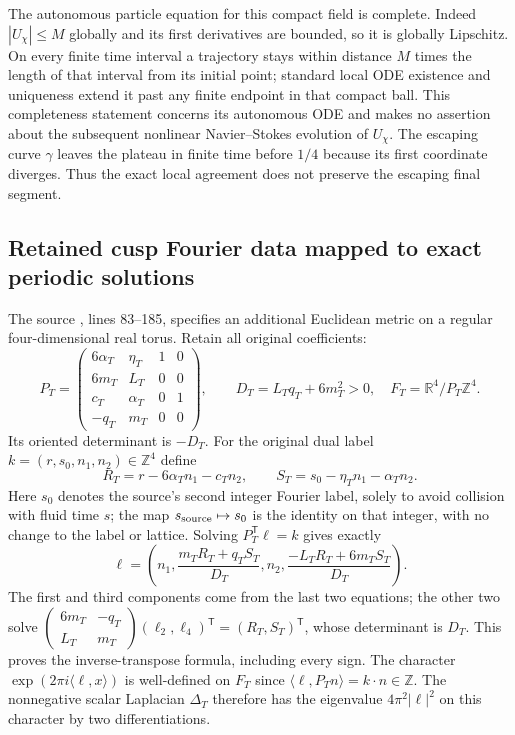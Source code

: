 The autonomous particle equation for this compact field is complete.
Indeed $|U_\chi|\le M$ globally and its first derivatives are bounded,
so it is globally Lipschitz.  On every finite time interval a trajectory
stays within distance $M$ times the length of that interval from its
initial point; standard local ODE existence and uniqueness extend it
past any finite endpoint in that compact ball.  This completeness
statement concerns its autonomous ODE and makes no assertion about
the subsequent nonlinear Navier--Stokes evolution of $U_\chi$.
The escaping curve $\gamma$ leaves the plateau in finite time before
$1/4$ because its first coordinate diverges.  Thus the exact local
agreement does not preserve the escaping final segment.

\subsection{Retained cusp Fourier data mapped to exact periodic solutions}
The source
,
lines 83--185, specifies an additional Euclidean metric on a regular
four-dimensional real torus.  Retain all original coefficients:
\[
 P_T=\begin{pmatrix}
 6\alpha_T&\eta_T&1&0\\6m_T&L_T&0&0\\
 c_T&\alpha_T&0&1\\-q_T&m_T&0&0
 \end{pmatrix},\qquad D_T=L_Tq_T+6m_T^2>0,
 \quad F_T=\mathbb R^4/P_T\mathbb Z^4.
\]
Its oriented determinant is $-D_T$.  For the original dual label
$k=(r,s_0,n_1,n_2)\in\mathbb Z^4$ define
\[
 R_T=r-6\alpha_Tn_1-c_Tn_2,\qquad
 S_T=s_0-\eta_Tn_1-\alpha_Tn_2.
\]
Here $s_0$ denotes the source's second integer Fourier label, solely to
avoid collision with fluid time $s$; the map $s_{\rm source}\mapsto s_0$
is the identity on that integer, with no change to the label or lattice.
Solving $P_T^{\mathsf T}\ell=k$ gives exactly
\[
 \ell=\left(n_1,\frac{m_TR_T+q_TS_T}{D_T},n_2,
                  \frac{-L_TR_T+6m_TS_T}{D_T}\right).
\]
The first and third components come from the last two equations; the other
two solve
$\begin{pmatrix}6m_T&-q_T\\L_T&m_T\end{pmatrix}
(\ell_2,\ell_4)^{\mathsf T}=(R_T,S_T)^{\mathsf T}$,
whose determinant is $D_T$.  This proves the inverse-transpose formula,
including every sign.  The character
$\exp(2\pi i\langle\ell,x\rangle)$ is well-defined on $F_T$ since
$\langle\ell,P_Tn\rangle=k\cdot n\in\mathbb Z$.
The nonnegative scalar Laplacian $\Delta_T$ therefore has the eigenvalue
$4\pi^2|\ell|^2$ on this character by two differentiations.

